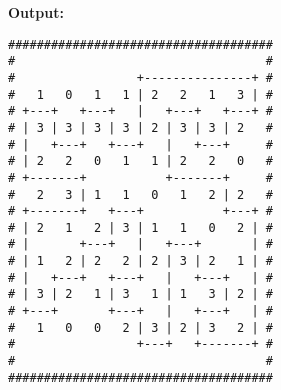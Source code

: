 \textbf{Output:}
\begin{verbatim}
#####################################
#                                   #
#                 +---------------+ #
#   1   0   1   1 | 2   2   1   3 | #
# +---+   +---+   |   +---+   +---+ #
# | 3 | 3 | 3 | 3 | 2 | 3 | 3 | 2   #
# |   +---+   +---+   |   +---+     #
# | 2   2   0   1   1 | 2   2   0   #
# +-------+           +-------+     #
#   2   3 | 1   1   0   1   2 | 2   #
# +-------+   +---+           +---+ #
# | 2   1   2 | 3 | 1   1   0   2 | #
# |       +---+   |   +---+       | #
# | 1   2 | 2   2 | 2 | 3 | 2   1 | #
# |   +---+   +---+   |   +---+   | #
# | 3 | 2   1 | 3   1 | 1   3 | 2 | #
# +---+       +---+   |   +---+   | #
#   1   0   0   2 | 3 | 2 | 3   2 | #
#                 +---+   +-------+ #
#                                   #
#####################################
\end{verbatim}
